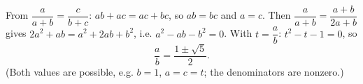 From $\dfrac {a}{a+b}=\dfrac {c}{b+c}$: $ab+ac=ac+bc$, so $ab=bc$ and $a=c$. Then $\dfrac{a}{a+b}=\dfrac{a+b}{2a+b}$ gives $2a^2+ab=a^2+2ab+b^2$, i.e. $a^2-ab-b^2=0$. With $t=\dfrac {a}{b}$: $t^2-t-1=0$, so
\[\dfrac {a}{b}=\boxed{\dfrac{1\pm\sqrt5}{2}}.\]
(Both values are possible, e.g. $b=1$, $a=c=t$; the denominators are nonzero.)
